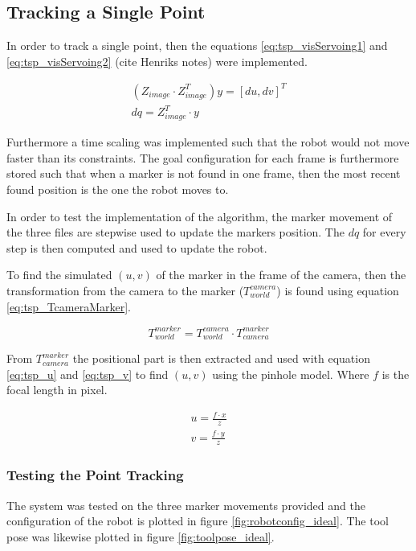 \subsection{Tracking a Single Point}
In order to track a single point, then the equations \ref{eq:tsp_visServoing1} and \ref{eq:tsp_visServoing2} (cite Henriks notes) were implemented.

\begin{eqnarray}
(Z_{image} \cdot Z_{image}^T) y = [du, dv]^T \label{eq:tsp_visServoing1} \\
dq = Z_{image}^T \cdot y \label{eq:tsp_visServoing2}
\end{eqnarray}

Furthermore a time scaling was implemented such that the robot would not move faster than its constraints.
The goal configuration for each frame is furthermore stored such that when a marker is not found in one frame, then the most recent found position is the one the robot moves to.

In order to test the implementation of the algorithm, the marker movement of the three files are stepwise used to update the markers position.
The $dq$ for every step is then computed and used to update the robot.

To find the simulated $(u,v)$ of the marker in the frame of the camera, then the transformation from the camera to the marker ($T_{world}^{camera}$) is found using equation \ref{eq:tsp_TcameraMarker}.

\begin{equation}
T_{world}^{marker} = T_{world}^{camera} \cdot T_{camera}^{marker} \label{eq:tsp_TcameraMarker}
\end{equation}

From $T_{camera}^{marker}$ the positional part is then extracted and used with equation \ref{eq:tsp_u} and \ref{eq:tsp_v} to find $(u,v)$ using the pinhole model.
Where $f$ is the focal length in pixel.

\begin{eqnarray}
u = \frac{f \cdot x}{z} \label{eq:tsp_u} \\
v = \frac{f \cdot y}{z} \label{eq:tsp_v}
\end{eqnarray}


\subsubsection{Testing the Point Tracking}

The system was tested on the three marker movements provided and the configuration of the robot is plotted in figure \ref{fig:robotconfig_ideal}.
The tool pose was likewise plotted in figure \ref{fig:toolpose_ideal}.


